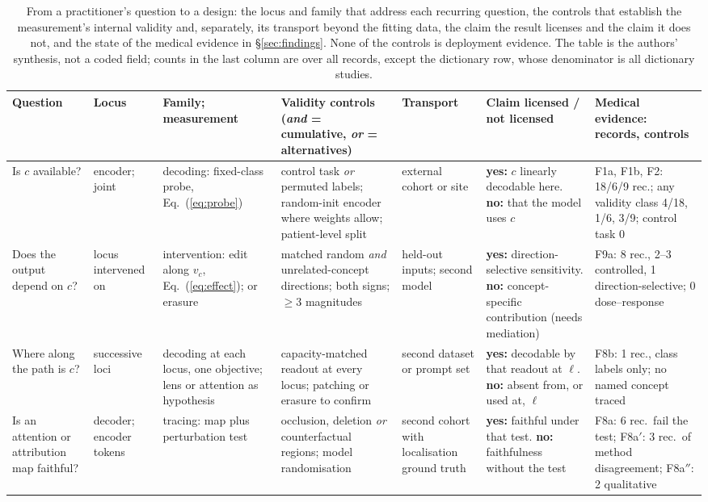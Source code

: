 \begin{table}[!t]
\centering\footnotesize\setlength\tabcolsep{2.5pt}\renewcommand{\arraystretch}{1.0}
\caption{From a practitioner's question to a design: the locus and family that address each recurring
question, the controls that establish the measurement's internal validity and, separately, its transport
beyond the fitting data, the claim the result licenses and the claim it does not, and the state of the
medical evidence in \S\ref{sec:findings}. None of the controls is deployment evidence. The table is the
authors' synthesis, not a coded field; counts in the last column are over all records, except the
dictionary row, whose denominator is all \Nsae{} dictionary studies.}
\label{tab:practice}
\begin{tabular}{@{}L{1.70cm}L{1.25cm}L{2.35cm}L{3.15cm}L{1.55cm}L{2.85cm}L{2.35cm}@{}}
\toprule
Question & Locus & Family; measurement & Validity controls (\emph{and} = cumulative, \emph{or} = alternatives) & Transport & Claim licensed / not licensed & Medical evidence: records, controls \\
\midrule
Is $c$ available? & encoder; joint & decoding: fixed-class probe, Eq.~(\ref{eq:probe}) & control task \emph{or} permuted labels; random-init encoder where weights allow; patient-level split & external cohort or site & \textbf{yes:} $c$ linearly decodable here. \textbf{no:} that the model uses $c$ & F1a, F1b, F2: 18/6/9 rec.; any validity class 4/18, 1/6, 3/9; control task 0 \\
Does the output depend on $c$? & locus intervened on & intervention: edit along $v_c$, Eq.~(\ref{eq:effect}); or erasure & matched random \emph{and} unrelated-concept directions; both signs; $\ge$3 magnitudes & held-out inputs; second model & \textbf{yes:} direction-selective sensitivity. \textbf{no:} concept-specific contribution (needs mediation) & F9a: 8 rec., 2--3 controlled, 1 direction-selective; 0 dose--response \\
Where along the path is $c$? & successive loci & decoding at each locus, one objective; lens or attention as hypothesis & capacity-matched readout at every locus; patching or erasure to confirm & second dataset or prompt set & \textbf{yes:} decodable by that readout at $\ell$. \textbf{no:} absent from, or used at, $\ell$ & F8b: 1 rec., class labels only; no named concept traced \\
Is an attention or attribution map faithful? & decoder; encoder tokens & tracing: map plus perturbation test & occlusion, deletion \emph{or} counterfactual regions; model randomisation & second cohort with localisation ground truth & \textbf{yes:} faithful under that test. \textbf{no:} faithfulness without the test & F8a: 6 rec.\ fail the test; F8a$'$: 3 rec.\ of method disagreement; F8a$''$: 2 qualitative \\

\end{tabular}
\end{table}
